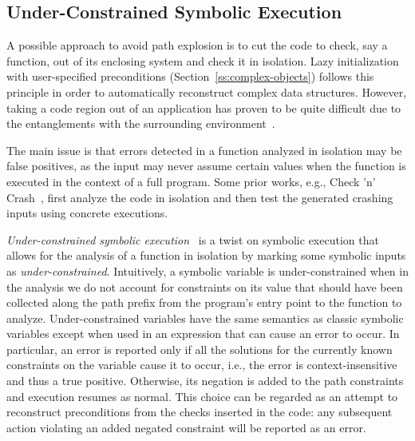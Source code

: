 \subsection{Under-Constrained Symbolic Execution} 
\label{under-constrained}

A possible approach to avoid path explosion is to cut the code to check, say a function, out of its enclosing system and check it in isolation. Lazy initialization with user-specified preconditions (Section~\ref{ss:complex-objects}) follows this principle in order to automatically reconstruct complex  data structures. However, taking a code region out of an application has proven to be quite difficult due to the entanglements with the surrounding environment~\cite{ED-ISSTA07}.

The main issue is that errors detected in a function analyzed in isolation may be false positives, as the input may never assume certain values when the function is executed in the context of a full program. Some prior works, e.g., {\sc Check 'n' Crash}~\cite{CS-ICSE05}, first analyze the code in isolation and then test the generated crashing inputs using concrete executions.

{\em Under-constrained symbolic execution}~\cite{ED-ISSTA07} is a twist on symbolic execution that allows for the analysis of a function in isolation by marking some symbolic inputs as {\em under-constrained}. Intuitively, a symbolic variable is under-constrained when in the analysis we do not account for constraints on its value that should have been collected along the path prefix from the program's entry point to the function to analyze. Under-constrained variables have the same semantics as classic symbolic variables except when used in an expression that can cause an error to occur. In particular, an error is reported only if all the solutions for the currently known constraints on the variable cause it to occur, i.e., the error is context-insensitive and thus a true positive. Otherwise, its negation is added to the path constraints and execution resumes as normal. This choice can be regarded as an attempt to reconstruct preconditions from the checks inserted in the code: any subsequent action violating an added negated constraint will be reported as an error.

